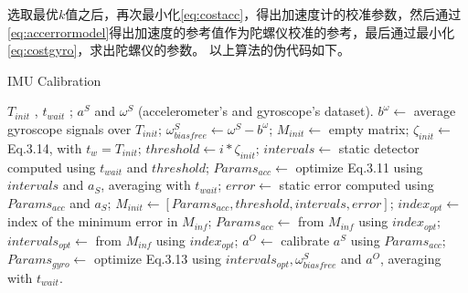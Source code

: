 \documentclass[
  type=master
]{gdutthesis}
\begin{document}
选取最优$k$值之后，再次最小化\autoref{eq:costacc}，得出加速度计的校准参数，然后通过\autoref{eq:accerrormodel}得出加速度的参考值作为陀螺仪校准的参考，最后通过最小化\autoref{eq:costgyro}，求出陀螺仪的参数。
以上算法的伪代码如下。
\begin{algorithm}[H] 
	\caption{IMU Calibration} 
	\label{alg1} 
	\begin{algorithmic}
		\REQUIRE $T_{init}$ , $t_{wait}$ ; $a^S$ and $\omega^S$ (accelerometer's and
		gyroscope's dataset).
		\STATE $b^{\omega} \gets$ average gyroscope signals over $T_{init}$; 
		\STATE $\omega^S_{biasfree} \gets \omega^S - b^{\omega}$; 
		\STATE $M_{init} \gets$ empty matrix; 
		\STATE $\zeta_{init} \gets $ Eq.3.14, with $t_w = T_{init}$;
		\STATE $threshold \gets i*\zeta_{init}$;
		\STATE $intervals \gets$ static detector computed using $t_{wait}$ and $threshold$;
		\STATE $Params_{acc} \gets$ optimize Eq.3.11 using
		$intervals$ and $a_S$, averaging with $t_{wait}$; 
		\STATE $error \gets $ static error computed using $Params_{acc}$ and $a_S$;
		\STATE $M_{init} \gets [Params_{acc},threshold,intervals,error]$;
		\ENDFOR
		\STATE $index_{opt} \gets $ index of the minimum error in $M_{inf}$; 
		\STATE $Params_{acc} \gets $ from $M_{inf}$ using $index_{opt}$; 
		\STATE $intervals_{opt} \gets $ from $M_{inf}$ using $index_{opt}$; 
		\STATE $a^O \gets$ calibrate $a^S$ using $Params_{acc}$;
		\STATE $Params_{gyro} \gets $ optimize Eq.3.13 using $intervals_{opt},\omega^S_{biasfree}$ and $a^O$, averaging with $t_{wait}$. 
	\end{algorithmic} 
\end{algorithm}

\end{document}
